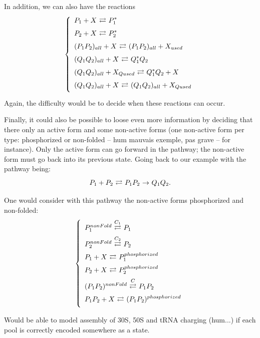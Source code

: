In addition, we can also have the reactions
$$
  \left\{
    \begin{array}{l}
      \reactionRev{P_1 + X}{P_1^*}{}{} \\
      \reactionRev{P_2 + X}{P_2^*}{}{} \\
      \reactionRev{(P_1P_2)_{all} + X}{(P_1P_2)_{all} + X_{used}}{}{} \\
      \reactionRev{(Q_1Q_2)_{all} + X}{Q_1^*Q_2}{}{} \\
      \reactionRev{(Q_1Q_2)_{all} + X_{Qused}}{Q_1^*Q_2 + X}{}{} \\
      \reactionRev{(Q_1Q_2)_{all} + X}{(Q_1Q_2)_{all} + X_{Qused}}{}{} \\
    \end{array}
  \right.
$$
Again, the difficulty would be to decide when these reactions can occur.

Finally, it could also be possible to loose even more information by deciding that there only an active form and some non-active forms (one non-active form per type: phosphorized or non-folded -- hum mauvais exemple, pas grave -- for instance). Only the active form can go forward in the pathway; the non-active form must go back into its previous state. Going back to our example with the pathway being:
$$
  \reactionIrr{\reactionRev{P_1+P_2}{P_1P_2}{}{}}{Q_1Q_2}{}{} .
$$
One would consider with this pathway the non-active forms phosphorized and non-folded:
$$
  \left\{
    \begin{array}{l}
      \reactionRev{P_1^{nonFold}}{P_1}{C_1}{} \\
      \reactionRev{P_2^{nonFold}}{P_2}{C_2}{} \\
      \reactionRev{P_1 + X}{P_1^{phosphorized}}{}{} \\
      \reactionRev{P_2 + X}{P_2^{phosphorized}}{}{} \\
      \reactionRev{(P_1P_2)^{nonFold}}{P_1P_2}{C}{} \\
      \reactionRev{P_1P_2 + X}{(P_1P_2)^{phosphorized}}{}{} \\
    \end{array}
  \right.
$$



\medskip

\textcolor[rgb]{1.00,0.00,0.00}{Would be able to model assembly of 30S, 50S and tRNA charging (hum...) if each pool is correctly encoded somewhere as a state.
}